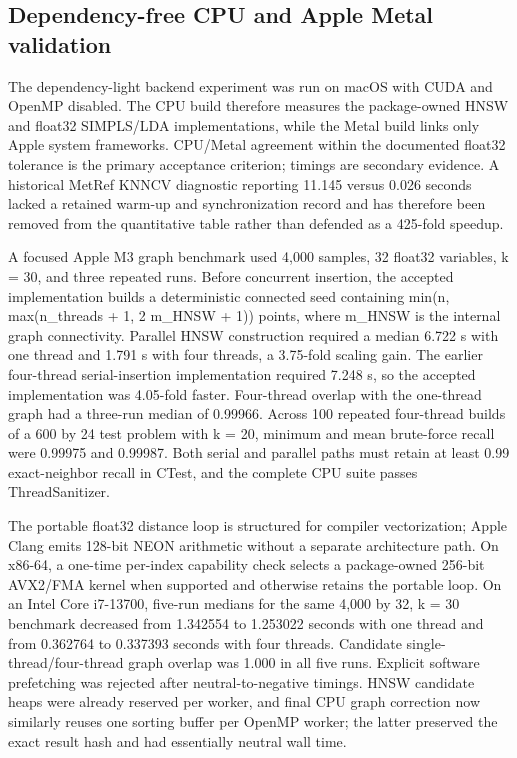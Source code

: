 \documentclass[twoside,11pt]{article}
\begin{document}
\begin{small}
\subsection{Dependency-free CPU and Apple Metal validation}
The dependency-light backend experiment was run on macOS with CUDA and OpenMP disabled. The CPU build therefore measures the package-owned HNSW and float32 SIMPLS/LDA implementations, while the Metal build links only Apple system frameworks. CPU/Metal agreement within the documented float32 tolerance is the primary acceptance criterion; timings are secondary evidence. A historical MetRef KNNCV diagnostic reporting 11.145 versus 0.026 seconds lacked a retained warm-up and synchronization record and has therefore been removed from the quantitative table rather than defended as a 425-fold speedup.

A focused Apple M3 graph benchmark used 4,000 samples, 32 float32 variables, k = 30, and three repeated runs. Before concurrent insertion, the accepted implementation builds a deterministic connected seed containing min(n, max(n\_threads + 1, 2 m\_HNSW + 1)) points, where m\_HNSW is the internal graph connectivity. Parallel HNSW construction required a median 6.722 s with one thread and 1.791 s with four threads, a 3.75-fold scaling gain. The earlier four-thread serial-insertion implementation required 7.248 s, so the accepted implementation was 4.05-fold faster. Four-thread overlap with the one-thread graph had a three-run median of 0.99966. Across 100 repeated four-thread builds of a 600 by 24 test problem with k = 20, minimum and mean brute-force recall were 0.99975 and 0.99987. Both serial and parallel paths must retain at least 0.99 exact-neighbor recall in CTest, and the complete CPU suite passes ThreadSanitizer.

The portable float32 distance loop is structured for compiler vectorization; Apple Clang emits 128-bit NEON arithmetic without a separate architecture path. On x86-64, a one-time per-index capability check selects a package-owned 256-bit AVX2/FMA kernel when supported and otherwise retains the portable loop. On an Intel Core i7-13700, five-run medians for the same 4,000 by 32, k = 30 benchmark decreased from 1.342554 to 1.253022 seconds with one thread and from 0.362764 to 0.337393 seconds with four threads. Candidate single-thread/four-thread graph overlap was 1.000 in all five runs. Explicit software prefetching was rejected after neutral-to-negative timings. HNSW candidate heaps were already reserved per worker, and final CPU graph correction now similarly reuses one sorting buffer per OpenMP worker; the latter preserved the exact result hash and had essentially neutral wall time.


\end{small}
\end{document}
